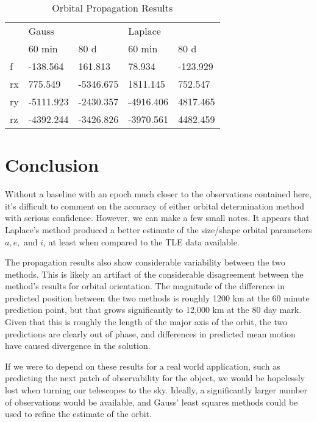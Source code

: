 \documentclass[11pt,twoside,letterpaper]{article}
\begin{document}
  \begin{table}[]
    \centering
    \begin{tabular}{lllll}
      & \multicolumn{2}{l}{Gauss} & \multicolumn{2}{l}{Laplace} \\
      & 60 min & 80 d & 60 min & 80 d \\ \cline{2-5} 
      \multicolumn{1}{l|}{f} & \multicolumn{1}{l|}{-138.564} & \multicolumn{1}{l|}{161.813} & \multicolumn{1}{l|}{78.934} & \multicolumn{1}{l|}{-123.929} \\ \cline{2-5} 
      \multicolumn{1}{l|}{rx} & \multicolumn{1}{l|}{775.549} & \multicolumn{1}{l|}{-5346.675} & \multicolumn{1}{l|}{1811.145} & \multicolumn{1}{l|}{752.547} \\ \cline{2-5} 
      \multicolumn{1}{l|}{ry} & \multicolumn{1}{l|}{-5111.923} & \multicolumn{1}{l|}{-2430.357} & \multicolumn{1}{l|}{-4916.406} & \multicolumn{1}{l|}{4817.465} \\ \cline{2-5} 
      \multicolumn{1}{l|}{rz} & \multicolumn{1}{l|}{-4392.244} & \multicolumn{1}{l|}{-3426.826} & \multicolumn{1}{l|}{-3970.561} & \multicolumn{1}{l|}{4482.459} \\ \cline{2-5} 
    \end{tabular}
    \caption{Orbital Propagation Results}
    \label{propagationResults}
  \end{table}
  
  \section{Conclusion}
  Without a baseline with an epoch much closer to the observations
  contained here, it's difficult to comment on the accuracy of either
  orbital determination method with serious confidence. However, we
  can make a few small notes. It appears that Laplace's method
  produced a better estimate of the size/shape orbital parameters
  $a, e,$ and $i$, at least when compared to the TLE data available.

  The propagation results also show considerable variability between
  the two methods. This is likely an artifact of the considerable
  disagreement between the method's results for orbital
  orientation. The magnitude of the difference in predicted position
  between the two methods is roughly 1200 km at the 60 minute
  prediction point, but that grows significantly to 12,000 km at the
  80 day mark. Given that this is roughly the length of the major axis
  of the orbit, the two predictions are clearly out of phase, and
  differences in predicted mean motion have caused divergence in the
  solution.

  If we were to depend on these results for a real world application,
  such as predicting the next patch of observability for the object,
  we would be hopelessly lost when turning our telescopes to the
  sky. Ideally, a significantly larger number of observations would be
  available, and Gauss' least squares methods could be used to refine
  the estimate of the orbit.   
  
  {}
  
\end{document}
